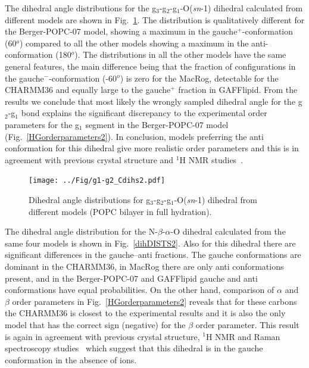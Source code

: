 \documentclass[journal=jacsat,manuscript=article]{achemso}
\begin{document}
The dihedral angle distributions for the  g$_3$-g$_2$-g$_1$-O(\textit{sn}-1) dihedral calculated from different models are
shown in Fig.~\ref{dihDISTS}. The distribution is qualitatively different for the Berger-POPC-07 model, showing a maximum in 
the gauche$^+$-conformation (60$^o$) compared to all the other models showing a maximum in the anti-conformation (180$^o$).
The distributions in all the other models have the same general features, the main difference being that the
fraction of configurations in the gauche$^-$-conformation (-60$^o$) is zero for the MacRog, detectable for the CHARMM36 and
equally large to the gauche$^+$ fraction in GAFFlipid. From the results we conclude that most likely the wrongly sampled
dihedral angle for the g$_2$-g$_1$ bond explains the significant discrepancy to the experimental order parameters
for the g$_1$ segment in the Berger-POPC-07 model (Fig.~\ref{HGorderparameters2}). 
In conclusion, models preferring the anti conformation for this dihedral give more realistic order parameters and
this is in agreement with previous crystal structure and $^1$H NMR studies~\cite{hauser80,hauser81,hauser81b,hauser88,pascher92,marsh06}.
\begin{figure}[]
  \centering
  \texttt{[image: ../Fig/g1-g2\_Cdihs2.pdf]}
  \caption{\label{dihDISTS}
    Dihedral angle distributions for g$_3$-g$_2$-g$_1$-O(\textit{sn}-1) dihedral from different models (POPC bilayer in full hydration).
      } 
\end{figure}

The dihedral angle distribution for the  N-$\beta$-$\alpha$-O dihedral calculated from the same four models is 
shown in Fig.~\ref{dihDISTS2}. Also for this dihedral there are significant differences in the gauche--anti fractions.
The gauche conformations are dominant in the CHARMM36, in MacRog there are only anti conformations present,
and in the Berger-POPC-07 and GAFFlipid gauche and anti conformations have equal probabilities. 
On the other hand, comparison of $\alpha$ and $\beta$ order parameters in Fig.~\ref{HGorderparameters2}
reveals that for these carbons the CHARMM36 is closest to the experimental results and it is also the only model that has the correct
sign (negative) for the $\beta$ order parameter. This result is again in agreement with previous 
crystal structure, $^1$H NMR and Raman spectroscopy studies~\cite{hauser80,hauser81,hauser81b,akutsu81b} which suggest that
this dihedral is in the gauche conformation in the absence of ions.
\end{document}
